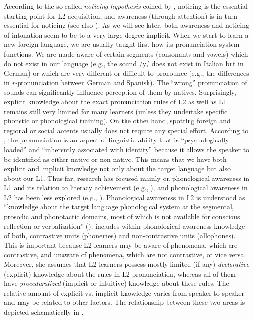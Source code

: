According to the so-called \textit{noticing hypothesis} coined by \citet{Schmidt1990}, noticing is the essential starting point for L2 acquisition, and awareness (through attention) is in turn essential for noticing (see also \citealt{Schmidt1993}). As we will see later, both awareness and noticing of intonation seem to be to a very large degree implicit. When we start to learn a new foreign language, we are usually taught first how its pronunciation system functions. We are made aware of certain segments (consonants and vowels) which do not exist in our language (e.g., the sound /y/ does not exist in Italian but in German) or which are very different or difficult to pronounce (e.g., the differences in \textit{r-}pronunciation between German and Spanish). The “wrong” pronunciation of sounds can significantly influence perception of them by natives. Surprisingly, explicit knowledge about the exact pronunciation rules of L2 as well as L1 remains still very limited for many learners (unless they undertake specific phonetic or phonological training). On the other hand, spotting foreign and regional or social accents usually does not require any special effort. According to \citet[42]{Moyer2004}, the pronunciation is an aspect of linguistic ability that is “psychologically loaded” and “inherently associated with identity” because it allows the speaker to be identified as either native or non-native. This means that we have both explicit and implicit knowledge not only about the target language but also about our L1. Thus far, research has focused mainly on phonological awareness in L1 and its relation to literacy achievement (e.g., \citealt{BradleyBryant1983, OakhillKyle2000, CunninghamCarroll2015}), and phonological awareness in L2 has been less explored (e.g., \citealt{GarcíaLecumberri2001, RamírezVerdugo2006, KennedyTrofimovich2010, Kivistö-deSouza2015}). Phonological awareness in L2 is understood as “knowledge about the target language phonological system at the segmental, prosodic and phonotactic domains, most of which is not available for conscious reflection or verbalization” (\citealt[105]{Kivistö-deSouza2015}). \citet{Kivistö-deSouza2015} includes within phonological awareness knowledge of both, contrastive units (phonemes) and non-contrastive units (allophones). This is important because L2 learners may be aware of phenomena, which are contrastive, and unaware of phenomena, which are not contrastive, or vice versa. Moreover, she assumes that L2 learners possess mostly limited (if any) \textit{declarative} (explicit) knowledge about the rules in L2 pronunciation, whereas all of them have \textit{proceduralized} (implicit or intuitive) knowledge about these rules. The relative amount of explicit vs. implicit knowledge varies from speaker to speaker and may be related to other factors. The relationship between these two areas is depicted schematically in .



